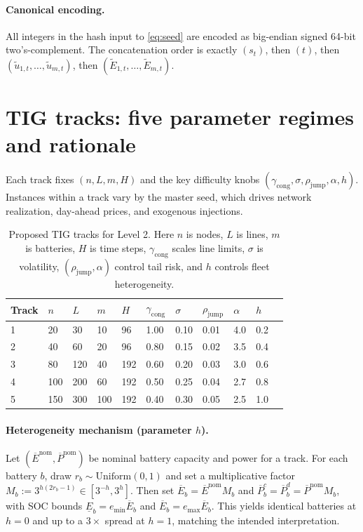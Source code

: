 \documentclass[11pt]{article}
\begin{document}
\paragraph{Canonical encoding.}
All integers in the hash input to \eqref{eq:seed} are encoded as big-endian signed 64-bit two's-complement. The concatenation order is exactly $(s_t)$, then $(t)$, then $(\tilde{u}_{1,t},\dots,\tilde{u}_{m,t})$, then $(\tilde{E}_{1,t},\dots,\tilde{E}_{m,t})$.

\section{TIG tracks: five parameter regimes and rationale}\label{app:tracks}
Each track fixes $(n,L,m,H)$ and the key difficulty knobs $(\gamma_{\mathrm{cong}},\sigma,\rho_{\mathrm{jump}},\alpha,h)$. Instances within a track vary by the master seed, which drives network realization, day-ahead prices, and exogenous injections.

\begin{table}[h]
\centering
\begin{tabular}{@{}lllllllllll@{}}
\toprule
\textbf{Track} &
$n$ &
$L$ &
$m$ &
$H$ &
$\gamma_{\mathrm{cong}}$ &
$\sigma$ &
$\rho_{\mathrm{jump}}$ &
$\alpha$ &
$h$ \\
\midrule
1 & 20  & 30  & 10  & 96  & 1.00 & 0.10 & 0.01 & 4.0 & 0.2 \\
2 & 40  & 60  & 20  & 96  & 0.80 & 0.15 & 0.02 & 3.5 & 0.4 \\
3 & 80  & 120 & 40  & 192 & 0.60 & 0.20 & 0.03 & 3.0 & 0.6 \\
4 & 100 & 200 & 60  & 192 & 0.50 & 0.25 & 0.04 & 2.7 & 0.8 \\
5 & 150 & 300 & 100 & 192 & 0.40 & 0.30 & 0.05 & 2.5 & 1.0 \\
\bottomrule
\end{tabular}
\caption{Proposed TIG tracks for Level 2. Here $n$ is nodes, $L$ is lines, $m$ is batteries, $H$ is time steps, $\gamma_{\mathrm{cong}}$ scales line limits, $\sigma$ is volatility, $(\rho_{\mathrm{jump}},\alpha)$ control tail risk, and $h$ controls fleet heterogeneity.}
\end{table}

\paragraph{Heterogeneity mechanism (parameter $h$).}
Let $(\overline{E}^{\mathrm{nom}},\overline{P}^{\mathrm{nom}})$ be nominal battery capacity and power for a track. For each battery $b$, draw $r_b\sim\mathrm{Uniform}(0,1)$ and set a multiplicative factor $M_b:=3^{h(2r_b-1)}\in[3^{-h},3^{h}]$. Then set $\overline{E}_b=\overline{E}^{\mathrm{nom}}M_b$ and $\overline{P}^c_b=\overline{P}^d_b=\overline{P}^{\mathrm{nom}}M_b$, with SOC bounds $\underline{E}_b=e_{\min}\overline{E}_b$ and $\overline{E}_b=e_{\max}\overline{E}_b$. This yields identical batteries at $h=0$ and up to a $3\times$ spread at $h=1$, matching the intended interpretation.
\end{document}
